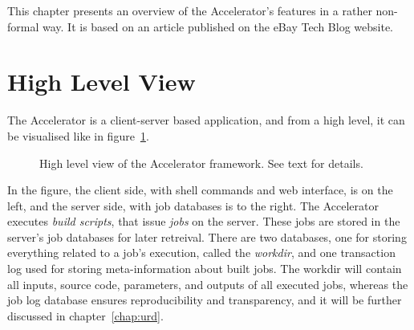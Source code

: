 

This chapter presents an overview of the Accelerator's features in a
rather non-formal way.  It is based on an article published on the
eBay Tech Blog website.



\section{High Level View}
The Accelerator is a client-server based application, and from a high
level, it can be visualised like in figure~\ref{fig:overview}.

\begin{figure}[h!]
  \begin{center}
    
    \caption{High level view of the Accelerator framework.  See text
      for details.}
    \label{fig:overview}
  \end{center}
\end{figure}

In the figure, the client side, with shell commands and web interface,
is on the left, and the server side, with job databases is to the
right.  The Accelerator executes \textsl{build scripts}, that issue
\textsl{jobs} on the server.  These jobs are stored in the server's
job databases for later retreival.  There are two databases, one for
storing everything related to a job's execution, called the
\textsl{workdir}, and one transaction log used for storing
meta-information about built jobs.  The workdir will contain all
inputs, source code, parameters, and outputs of all executed jobs,
whereas the job log database ensures reproducibility and transparency,
and it will be further discussed in chapter~\ref{chap:urd}.


